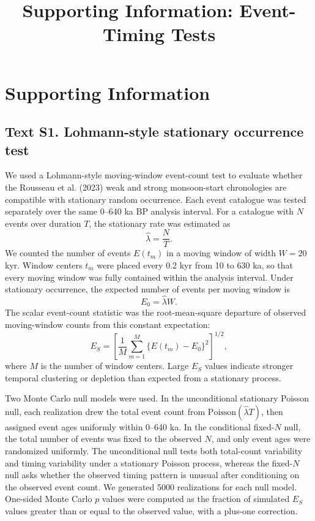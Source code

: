 \documentclass[11pt]{article}
\title{Supporting Information: Event-Timing Tests}
\author{}
\date{}
\begin{document}
\maketitle

\section*{Supporting Information}

\subsection*{Text S1. Lohmann-style stationary occurrence test}

We used a Lohmann-style moving-window event-count test to evaluate whether the Rousseau et al. (2023) weak and strong monsoon-start chronologies are compatible with stationary random occurrence. Each event catalogue was tested separately over the same 0--640 ka BP analysis interval. For a catalogue with \(N\) events over duration \(T\), the stationary rate was estimated as
\[
\hat{\lambda} = \frac{N}{T}.
\]
We counted the number of events \(E(t_m)\) in a moving window of width \(W=20\) kyr. Window centers \(t_m\) were placed every 0.2 kyr from 10 to 630 ka, so that every moving window was fully contained within the analysis interval. Under stationary occurrence, the expected number of events per moving window is
\[
E_0 = \hat{\lambda}W.
\]
The scalar event-count statistic was the root-mean-square departure of observed moving-window counts from this constant expectation:
\[
E_S =
\left[
\frac{1}{M}
\sum_{m=1}^{M}
\{E(t_m)-E_0\}^{2}
\right]^{1/2},
\]
where \(M\) is the number of window centers. Large \(E_S\) values indicate stronger temporal clustering or depletion than expected from a stationary process.

Two Monte Carlo null models were used. In the unconditional stationary Poisson null, each realization drew the total event count from \(\mathrm{Poisson}(\hat{\lambda}T)\), then assigned event ages uniformly within 0--640 ka. In the conditional fixed-\(N\) null, the total number of events was fixed to the observed \(N\), and only event ages were randomized uniformly. The unconditional null tests both total-count variability and timing variability under a stationary Poisson process, whereas the fixed-\(N\) null asks whether the observed timing pattern is unusual after conditioning on the observed event count. We generated 5000 realizations for each null model. One-sided Monte Carlo \(p\) values were computed as the fraction of simulated \(E_S\) values greater than or equal to the observed value, with a plus-one correction.
\end{document}
